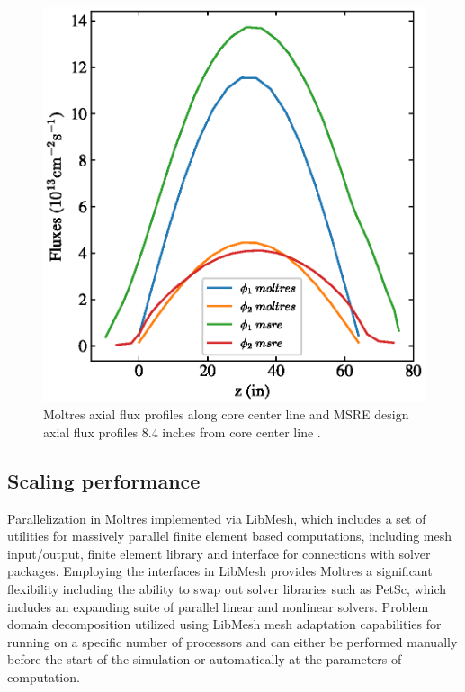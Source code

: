 \documentclass{article}
\makeatletter
\let\Oldsubsection\subsection
\renewcommand{\subsection}{\FloatBarrier\Oldsubsection}
\def\maxwidth#1{\ifdim\Gin@nat@width>#1 #1\else\Gin@nat@width\fi}
\makeatother
\begin{document}
\begin{figure}[htpb]
    \centering
    \includegraphics[width=\maxwidth{\textwidth}]{combined_msre_moltres_axial.eps}
    \caption{Moltres axial flux profiles along core center line and \gls{MSRE}
      design axial flux profiles 8.4 inches from core center line \cite[p. 91]{briggs_molten-salt_1964}.}
    \label{fig:axial_fluxes_compare}
\end{figure}

\subsection{Scaling performance}

Parallelization in Moltres implemented via LibMesh, which includes a set of utilities
 for massively parallel finite element based computations, including mesh input/output,
 finite element library and interface for connections with solver packages. Employing 
the interfaces in LibMesh provides Moltres a significant flexibility including the ability 
to swap out solver libraries such as PetSc, which includes an expanding suite of parallel 
linear and nonlinear solvers. Problem domain decomposition utilized using LibMesh mesh 
adaptation capabilities for running on a specific number of processors and can either be 
performed manually before the start of the simulation or automatically at the parameters of computation. 
\end{document}
